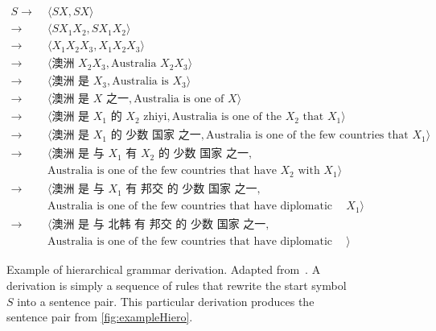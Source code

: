\begin{figure}
\begin{CJK}{UTF8}{gbsn}
  \begin{footnotesize}
    \begin{align}
      S \rightarrow&\; \langle S X, S X \rangle \nonumber \\
      \rightarrow&\; \langle S X_1 X_2, S X_1 X_2 \rangle \nonumber \\
      \rightarrow&\; \langle X_1 X_2 X_3, X_1 X_2 X_3 \rangle \nonumber \\
      \rightarrow&\; \langle \mbox{澳洲 } X_2 X_3, \mbox{Australia } X_2 X_3 \rangle \nonumber \\
      \rightarrow&\; \langle \mbox{澳洲 是 } X_3, \mbox{Australia is } X_3 \rangle \nonumber \\
      \rightarrow&\; \langle \mbox{澳洲 是 } X \mbox{ 之一}, \mbox{Australia is one of } X \rangle \nonumber \\
      \rightarrow&\; \langle \mbox{澳洲 是 } X_1 \mbox{ 的 } X_2 \mbox{ zhiyi}, \mbox{Australia is one of the } X_2 \mbox{ that } X_1 \rangle \nonumber \\
      \rightarrow&\; \langle \mbox{澳洲 是 } X_1 \mbox{ 的 少数 国家 之一}, \mbox{Australia is one of the few countries that } X_1 \rangle \nonumber \\
      \rightarrow&\; \langle \mbox{澳洲 是 与 } X_1 \mbox{ 有 } X_2 \mbox{ 的 少数 国家 之一}, \nonumber \\
      &\;                    \mbox{Australia is one of the few countries that have } X_2 \mbox{ with } X_1 \rangle \nonumber \\
      \rightarrow&\; \langle \mbox{澳洲 是 与 } X_1 \mbox{ 有 邦交 的 少数 国家 之一}, \nonumber \\
      &\;                    \mbox{Australia is one of the few countries that have diplomatic relations with } X_1 \rangle \nonumber \\
      \rightarrow&\; \langle \mbox{澳洲 是 与 北韩 有 邦交 的 少数 国家 之一}, \nonumber \\ 
      &\;                    \mbox{Australia is one of the few countries that have diplomatic relations with North Korea} \rangle \nonumber
    \end{align}
  \end{footnotesize}
  \caption{Example of hierarchical grammar derivation.
    Adapted from~\citep{chiang:2007:CL}.
    A derivation is simply a sequence of rules that
    rewrite the start symbol $S$ into a sentence pair.
    This particular derivation produces the sentence pair from \autoref{fig:exampleHiero}.} %
  \label{fig:exampleHieroDerivation}
\end{CJK}
\end{figure}
%

